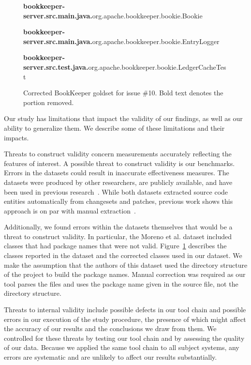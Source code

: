 

\begin{figure}[t]
\footnotesize

{\bf bookkeeper-server.src.main.java.}org.apache.bookkeeper.bookie.Bookie

{\bf bookkeeper-server.src.main.java.}org.apache.bookkeeper.bookie.EntryLogger

{\bf bookkeeper-server.src.test.java.}org.apache.bookkeeper.bookie.LedgerCacheTest

\caption{Corrected BookKeeper goldset for issue \#10. Bold text denotes the portion removed.}
\label{fig:goldsetfix}
\vspace{-15pt}
\end{figure}


Our study has limitations that impact the validity of our findings,
as well as our ability to generalize them.
We describe some of these limitations and their impacts.

Threats to construct validity concern measurements accurately reflecting the features of interest.
A possible threat to construct validity is our benchmarks.
Errors in the datasets could result in inaccurate effectiveness measures.
The datasets were produced by other researchers, are publicly available,
and have been used in previous research~\cite{Dit-etal:2013, Revelle-etal:2010, Moreno-etal:2014}.
While both datasets extracted source code entities automatically from changesets and patches,
previous work shows this approach is on par with manual extraction~\cite{Corley-etal:2011}.

Additionally, we found errors within the datasets themselves that would be a threat to construct validity.
In particular, the Moreno et al. dataset included classes that had package names that were not valid.
Figure~\ref{fig:goldsetfix} describes the classes reported in the dataset and the corrected classes used in our dataset.
We make the assumption that the authors of this dataset used the directory structure of the project to build the package names.
Manual correction was required as our tool parses the files and uses the package name given in the source file, not the directory structure.

Threats to internal validity include possible defects in our tool chain and possible errors
in our execution of the study procedure,
the presence of which might affect the accuracy of our results and the conclusions we draw from them.
We controlled for these threats by testing our tool chain and by assessing the quality of our data.
Because we applied the same tool chain to all subject systems, any errors are systematic and are unlikely
to affect our results substantially.

